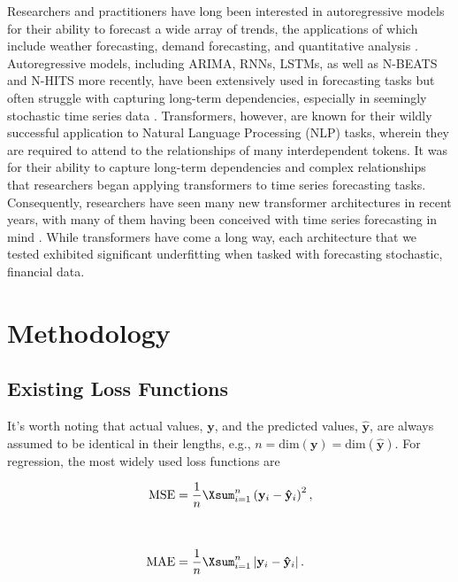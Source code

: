 \documentclass{article}
\begin{document}
Researchers and practitioners have long been interested in autoregressive models for their ability to forecast a wide array of trends, the applications of which include weather forecasting, demand forecasting, and quantitative analysis \cite{doi:10.1177/1847979018808673, andrychowicz2023deep, HO1998213, 10146913}. Autoregressive models, including ARIMA, RNNs, LSTMs, as well as N-BEATS \cite{DBLP:journals/corr/abs-1905-10437} and N-HITS \cite{challu2022nhits} more recently, have been extensively used in forecasting tasks but often struggle with capturing long-term dependencies, especially in seemingly stochastic time series data \cite{9005997, LINDEMANN2021650, KAREVAN20201, 8614252, CAO2019127, SAGHEER2019203}. Transformers, however, are known for their wildly successful application to Natural Language Processing (NLP) tasks, wherein they are required to attend to the relationships of many interdependent tokens. It was for their ability to capture long-term dependencies and complex relationships that researchers began applying transformers to time series forecasting tasks. Consequently, researchers have seen many new transformer architectures in recent years, with many of them having been conceived with time series forecasting in  mind \cite{zhou2021informer, wu2022autoformer, liu2023ring, brandon2023striped}. While transformers have come a long way, each architecture that we tested exhibited significant underfitting when tasked with forecasting stochastic, financial data.

\section{Methodology}

\subsection{Existing Loss Functions}

It's worth noting that actual values,  \( \mathbf{y} \), and the predicted values, \( \mathbf{ \hat{y} }\), are always assumed to be identical in their lengths, e.g.,  \( n = \text{dim} \left( \mathbf{y} \right) = \text{dim} \left( \mathbf{\hat{y}} \right) \). For regression, the most widely used loss functions are

\begin{align*}
    \text{MSE}
    &= \frac{1}{n} \Xsum^{n}_{i=1} \left( \mathbf{y}_i - \mathbf{\hat{y}}_i \right)^2,
    \\[30pt]
    \text{MAE}
    &= \frac{1}{n} \Xsum^{n}_{i=1} \left| \mathbf{y}_i - \mathbf{\hat{y}}_i \right|.
\end{align*}
\end{document}
